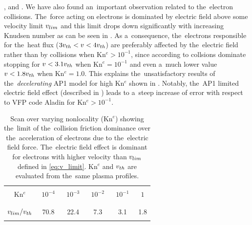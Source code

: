 , and . 
We have also found 
an~important observation related to the~electron collisions.
The~force acting on electrons is dominated by
electric field above some velocity limit $v_{lim}$ and this limit drops 
down significantly with increasing Knudsen number as can be seen 
in . 
As a~consequence, the~electrons responsible for the~heat flux
($3 v_{th} < v <4 v_{th}$) are preferably affected by the~electric field
rather than by collisions when Kn$^{e} > 10^{-1}$, since according to 
 collsions dominate stopping for $v < 3.1 v_{th}$ 
when Kn$^e = 10^{-1}$ and even a~much lower value $v < 1.8 v_{th}$ 
when Kn$^e = 1.0$. This explains the~unsatisfactory results of 
the~\textit{decelerating} AP1
model for high Kn$^e$ shown in . 
Notably, the~AP1 limited electric field effect (described in 
) leads to a~steep increase of error with respect 
to VFP code Aladin for Kn$^e > 10^{-1}$.

\begin{table}
\begin{center}
  \begin{tabular}{c|ccccc}
    \hline\hline\\
    Kn$^e$ & $\,\,10^{-4}\,\,$ & $\,\,10^{-3}\,\,$ & $\,\,10^{-2}\,\,$ & $\,\,10^{-1}\,\,$ & $\,\,1\,\,$ \\\\
    \hline\\
    $v_{lim} / v_{th}$ & 70.8 & 22.4 & 7.3 & 3.1 & 1.8\\\\
    \hline\hline
  \end{tabular}
  \caption{
  Scan over varying nonlocality (Kn$^e$) showing the~limit of 
  the~collision friction dominance over the~acceleration of electrons 
  due to the~electric field force. The~electric field effect is dominant
  for electrons with higher velocity than $v_{lim}$ defined in 
  \eqref{eq:v_limit}. Kn$^e$ and $v_{th}$ are evaluated from the~same 
  plasma profiles.
  }
\label{tab:vlim}
\end{center}
\end{table}


